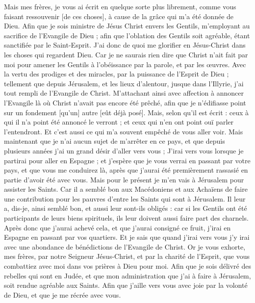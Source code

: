 \begin{multicols}{2}
Mais mes frères, je vous ai écrit en quelque sorte plus librement, comme vous faisant ressouvenir [de ces choses], à cause de la grâce qui m'a été donnée de Dieu.
Afin que je sois ministre de Jésus Christ envers les Gentils, m'employant au sacrifice de l'Evangile de Dieu ; afin que l'oblation des Gentils soit agréable, étant sanctifiée par le Saint-Esprit.
J'ai donc de quoi me glorifier en Jésus-Christ dans les choses qui regardent Dieu.
Car je ne saurais rien dire que Christ n'ait fait par moi pour amener les Gentils à l'obéissance par la parole, et par les œuvres.
Avec la vertu des prodiges et des miracles, par la puissance de l'Esprit de Dieu ; tellement que depuis Jérusalem, et les lieux d'alentour, jusque dans l'Illyrie, j'ai tout rempli de l'Evangile de Christ.
M'attachant ainsi avec affection à annoncer l'Evangile là où Christ n'avait pas encore été prêché, afin que je n'édifiasse point sur un fondement [qu'un] autre [eût déjà posé].
Mais, selon qu'il est écrit : ceux à qui il n'a point été annoncé le verront ; et ceux qui n'en ont point ouï parler l'entendront.
Et c'est aussi ce qui m'a souvent empêché de vous aller voir.
Mais maintenant que je n'ai aucun sujet de m'arrêter en ce pays, et que depuis plusieurs années j'ai un grand désir d'aller vers vous ;
J'irai vers vous lorsque je partirai pour aller en Espagne ; et j'espère que je vous verrai en passant par votre pays, et que vous me conduirez là, après que j'aurai été premièrement rassasié en partie d'avoir été avec vous.
Mais pour le présent je m'en vais à Jérusalem pour assister les Saints.
Car il a semblé bon aux Macédoniens et aux Achaïens de faire une contribution pour les pauvres d'entre les Saints qui sont à Jérusalem.
Il leur a, dis-je, ainsi semblé bon, et aussi leur sont-ils obligés : car si les Gentils ont été participants de leurs biens spirituels, ils leur doivent aussi faire part des charnels.
Après donc que j'aurai achevé cela, et que j'aurai consigné ce fruit, j'irai en Espagne en passant par vos quartiers.
Et je sais que quand j'irai vers vous j'y irai avec une abondance de bénédictions de l'Evangile de Christ.
Or je vous exhorte, mes frères, par notre Seigneur Jésus-Christ, et par la charité de l'Esprit, que vous combattiez avec moi dans vos prières à Dieu pour moi.
Afin que je sois délivré des rebelles qui sont en Judée, et que mon administration que j'ai à faire à Jérusalem, soit rendue agréable aux Saints.
Afin que j'aille vers vous avec joie par la volonté de Dieu, et que je me récrée avec vous.

\end{multicols}
